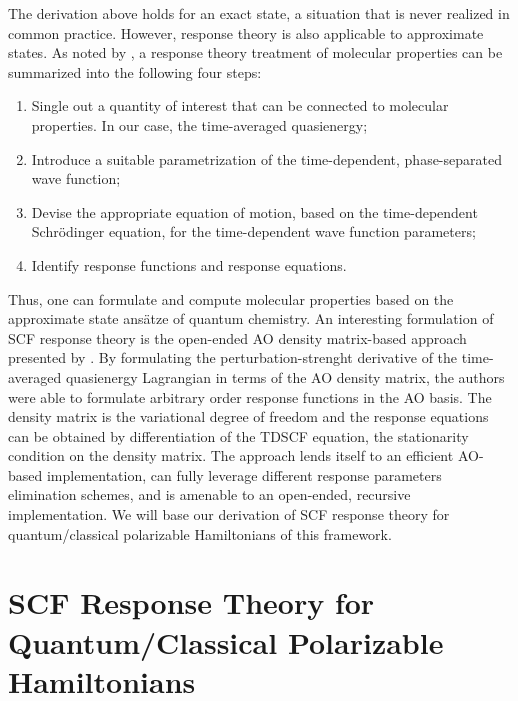 The derivation above holds for an exact state, a situation that is never
realized in common practice. However, response theory is
also applicable to approximate states.
As noted by \citeauthor{Norman2011-ad}, a response theory treatment of
molecular properties can be summarized into the following four
steps:\autocite{Norman2011-ad}
\begin{enumerate}
    \item Single out a quantity of interest that can be connected to
      molecular properties. In our case, the time-averaged
      quasienergy;
    \item Introduce a suitable parametrization of the time-dependent,
      phase-separated wave function;
    \item Devise the appropriate equation of motion, based on the
      time-dependent Schr\"{o}dinger equation, for the time-dependent
      wave function parameters;
    \item Identify response functions and response equations.
\end{enumerate}
Thus, one can formulate and compute molecular properties based on
the approximate state ans\"{a}tze of quantum chemistry.
An interesting formulation of \acrshort{SCF} response theory is the
open-ended \acrshort{AO} density matrix-based approach presented by
\citeauthor{Thorvaldsen2008-sg}.\autocite{Thorvaldsen2008-sg}
By formulating the perturbation-strenght derivative of the time-averaged
quasienergy Lagrangian in terms of the \acrshort*{AO} density matrix,
the authors were able to formulate arbitrary order response functions
in the \acrshort*{AO} basis.
The density matrix is the variational degree of freedom and the response
equations can be obtained by differentiation of the \gls{TDSCF}
equation, the stationarity condition on the density matrix.
The approach lends itself to an efficient \acrshort*{AO}-based
implementation,\autocite{Larsen2000-hj, Kjaergaard2008-hy} can fully
leverage different response parameters elimination
schemes,\autocite{Thorvaldsen2008-sg, Kristensen2008-hv} and is amenable
to an open-ended, recursive implementation.\autocite{Ringholm2014-gx,
Friese2015-kb, Friese2015-bu}
We will base our derivation of \acrshort*{SCF} response theory for
quantum/classical polarizable Hamiltonians of this framework.

\section{SCF Response Theory for Quantum/Classical Polarizable Hamiltonians}\label{sec:csm-response}

